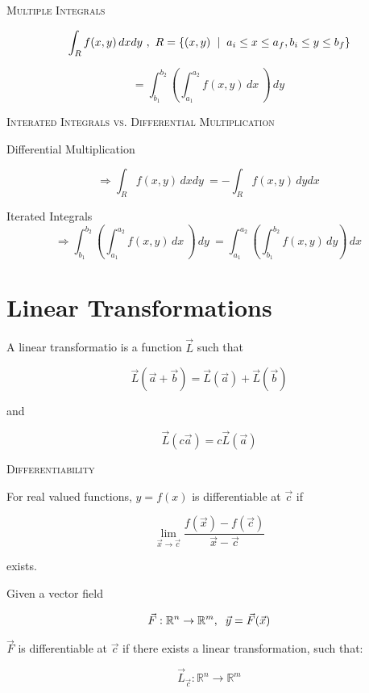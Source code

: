 \documentclass{article}
\begin{document}
\bigskip

\textsc{Multiple Integrals}

\[
\int_R f(x, y)\,dxdy\ , \ R = \{ (x, y) \hspace{2mm} | \hspace{2mm} a_i \le x \le a_f, b_i \le y \le b_f \}
\]

\[
= \int_{b_1}^{b_2} \left( \int_{a_1}^{a_2} f(x, y) \,dx\ \right) \,dy\
\]

\bigskip

\textsc{Interated Integrals vs. Differential Multiplication}

\smallskip

Differential Multiplication

\[
\Rightarrow \int_R f(x, y)\,dxdy\ = - \int_R f(x, y)\,dydx\
\]

Iterated Integrals
\[
\Rightarrow \int_{b_1}^{b_2} \left( \int_{a_1}^{a_2} f(x, y) \,dx\ \right) \,dy\ = \int_{a_1}^{a_2} \left( \int_{b_1}^{b_2} f(x, y)  \,dy \right) \,dx\
\]

\bigskip

\section{Linear Transformations}

\bigskip

A linear transformatio is a function $\vec{L}$ such that

\[
\vec{L}(\vec{a} + \vec{b}) = \vec{L}(\vec{a}) + \vec{L}(\vec{b}) 
\]

and 

\[
\vec{L}(c\vec{a}) = c\vec{L}(\vec{a})
\]

\bigskip

\textsc{Differentiability}

For real valued functions, $y = f(x)$ is differentiable at $\vec{c}$ if 

\[
\lim_{\vec{x} \to \vec{c}} \frac{f(\vec{x}) - f(\vec{c})}{\vec{x} - \vec{c}}
\]

exists.

\bigskip

Given a vector field

\[
\vec{F}: \mathbb{R}^n \to \mathbb{R}^m, \hspace{2mm} \vec{y} = \vec{F}(\vec{x})
\]

$\vec{F}$ is differentiable at $\vec{c}$ if there exists a linear transformation, such that:

\[
\vec{L}_{\vec{c}}: \mathbb{R}^n \to \mathbb{R}^m
\]
\end{document}
